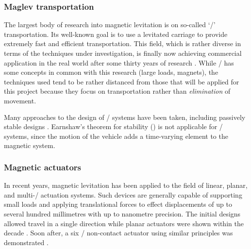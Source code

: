 \documentclass[11pt,a4paper]{memoir}
\begin{document}
\subsubsection{Maglev transportation}

The largest body of research into magnetic levitation is on so-called `\maglev/' transportation.
Its well-known goal is to use a levitated carriage to provide extremely fast and efficient transportation.
This field, which is rather diverse in terms of the techniques under investigation, is finally now achieving commercial application in the real world after some thirty years of research \parencite{lee2006-ietm}.
While \maglev/ has some concepts in common with this research (large loads, magnets), the techniques used tend to be rather distanced from those that will be applied for this project because they focus on transportation rather than \emph{elimination} of movement.

Many approaches to the design of \maglev/ systems have been taken, including passively stable designs \cite{musolino2009,hasirci2011-ieps}.
Earnshaw's theorem for stability () is not applicable for \maglev/ systems, since the motion of the vehicle adds a time-varying element to the magnetic system.


\subsubsection{Magnetic actuators}

In recent years, magnetic levitation has been applied to the field of linear, planar, and multi-\dof/ actuation systems.
Such devices are generally capable of supporting small loads and applying translational forces to effect displacements of up to several hundred millimetres with up to nanometre precision.
The initial designs allowed travel in a single direction \parencite[\eg,][]{trumper1992} while planar actuators were shown within the decade \parencite[\eg,][]{kim1997-thesis,molenaar2000}.
Soon after, a six \dof/ non-contact actuator using similar principles was demonstrated \cite{verma2004}.
\end{document}
